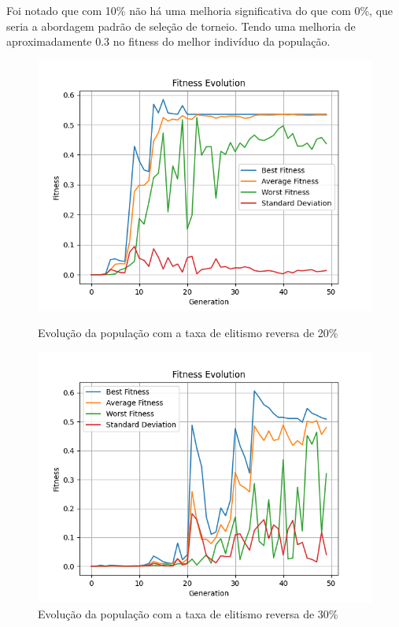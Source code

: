 \documentclass[12pt]{article}
\begin{document}
Foi notado que com 10\% não há uma melhoria significativa do que com 0\%, que seria a abordagem padrão de seleção de torneio. Tendo uma melhoria de aproximadamente 0.3 no fitness do melhor indivíduo da população.

\begin{figure}[h]
    \centering
    \begin{minipage}{0.45\textwidth}
        \centering
        \includegraphics[width=\linewidth]{figures/sexuado/rev_ev_20.png}
        \caption{Evolução da população com a taxa de elitismo reversa de 20\%}
        \label{fig:fifth-reverse_elitism_sex_20}
    \end{minipage}\hfill
    \begin{minipage}{0.45\textwidth}
        \centering
        \includegraphics[width=\linewidth]{figures/sexuado/rev_el_30.png}
        \caption{Evolução da população com a taxa de elitismo reversa de 30\%}
        \label{fig:reverse_elitism_sex_30}
    \end{minipage}
\end{figure}
\end{document}
